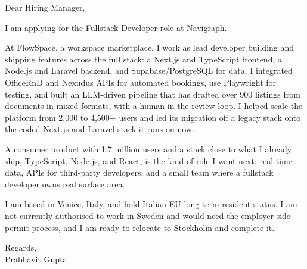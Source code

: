 \documentclass[a4paper,11pt]{article}
\begin{document}
Dear Hiring Manager,

I am applying for the Fullstack Developer role at Navigraph.

At FlowSpace, a workspace marketplace, I work as lead developer building and shipping features across the full stack: a Next.js and TypeScript frontend, a Node.js and Laravel backend, and Supabase/PostgreSQL for data. I integrated OfficeRnD and Nexudus APIs for automated bookings, use Playwright for testing, and built an LLM-driven pipeline that has drafted over 900 listings from documents in mixed formats, with a human in the review loop. I helped scale the platform from 2,000 to 4,500+ users and led its migration off a legacy stack onto the coded Next.js and Laravel stack it runs on now.

A consumer product with 1.7 million users and a stack close to what I already ship, TypeScript, Node.js, and React, is the kind of role I want next: real-time data, APIs for third-party developers, and a small team where a fullstack developer owns real surface area.

I am based in Venice, Italy, and hold Italian EU long-term resident status. I am not currently authorised to work in Sweden and would need the employer-side permit process, and I am ready to relocate to Stockholm and complete it.

Regards,\\
Prabhavit Gupta
\end{document}
